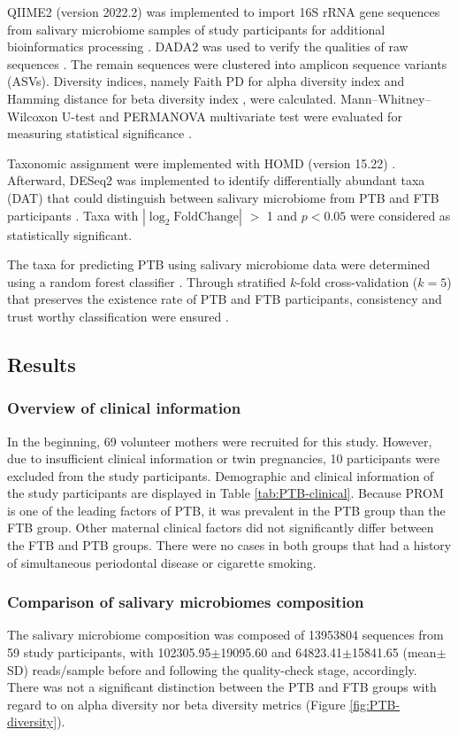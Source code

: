 \documentclass[11pt, a4paper, onecolumn, oneside]{report}
\begin{document}
                QIIME2 (version 2022.2) was implemented to import 16S rRNA gene sequences from salivary microbiome samples of study participants for additional bioinformatics processing \cite{QIIME2-1}. DADA2 was used to verify the qualities of raw sequences \cite{DADA2-1}. The remain sequences were clustered into amplicon sequence variants (ASVs). Diversity indices, namely Faith PD for alpha diversity index \cite{FaithPD-1} and Hamming distance for beta diversity index \cite{Hamming-1}, were calculated. Mann–Whitney–Wilcoxon U-test and PERMANOVA multivariate test were evaluated for measuring statistical significance \cite{PERMANOVA-1, PERMANOVA-2}.

                Taxonomic assignment were implemented with HOMD (version 15.22) \cite{HOMD-1}. Afterward, DESeq2 was implemented to identify differentially abundant taxa (DAT) that could distinguish between salivary microbiome from PTB and FTB participants \cite{DESeq2-1}. Taxa with $| \log _2 \textrm{FoldChange} |$ $>$ 1 and $p < 0.05$ were considered as statistically significant.

                The taxa for predicting PTB using salivary microbiome data were determined using a random forest classifier \cite{RF-1}. Through stratified $k$-fold cross-validation ($k=5$) that preserves the existence rate of PTB and FTB participants, consistency and trust worthy classification were ensured \cite{Kfold-1}.
        \newpage

        \subsection{Results}
            \subsubsection{Overview of clinical information}
                In the beginning, 69 volunteer mothers were recruited for this study. However, due to insufficient clinical information or twin pregnancies, 10 participants were excluded from the study participants. Demographic and clinical information of the study participants are displayed in Table \ref{tab:PTB-clinical}. Because PROM is one of the leading factors of PTB, it was prevalent in the PTB group than the FTB group. Other maternal clinical factors did not significantly differ between the FTB and PTB groups. There were no cases in both groups that had a history of simultaneous periodontal disease or cigarette smoking.

            \subsubsection{Comparison of salivary microbiomes composition}
                The salivary microbiome composition was composed of 13953804 sequences from 59 study participants, with 102305.95$\pm$19095.60 and 64823.41$\pm$15841.65 (mean$\pm$SD) reads/sample before and following the quality-check stage, accordingly. There was not a significant distinction between the PTB and FTB groups with regard to on alpha diversity nor beta diversity metrics (Figure \ref{fig:PTB-diversity}).
\end{document}
